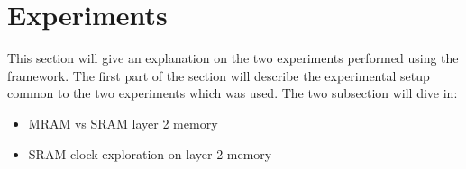 \section{Experiments}
This section will give an explanation on the two experiments performed using the framework.
The first part of the section will describe the experimental setup common to the two experiments which was used.
The two subsection will dive in:
\begin{itemize}
	\item MRAM vs SRAM layer 2 memory
	\item SRAM clock exploration on layer 2 memory
\end{itemize}
